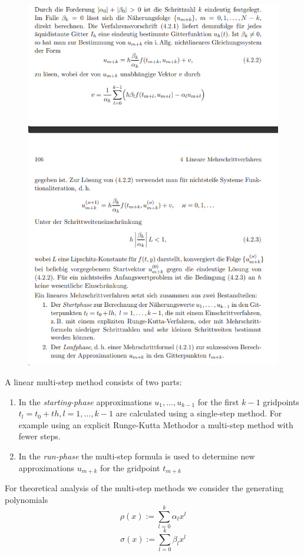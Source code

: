 	\begin{figure}[H]
		\centering
		\includegraphics[width=0.7\linewidth]{screenshot010}
		\caption{}
		\label{fig:screenshot010}
	\end{figure}
	
	A linear multi-step method consists of two parts:
	\begin{enumerate}
		\item In the \emph{starting-phase} approximations $u_1,...,u_{k-1}$ for the first $k-1$ gridpoints $t_l = t_0+th, l=1,...,k-1$ are calculated using a single-step method. For example using an explicit Runge-Kutta Methodor a multi-step method with fewer steps.
		
		\item  In the \emph{run-phase} the multi-step formula is used to determine new approximations $u_{m+k}$ for the gridpoint $t_{m+k}$
	\end{enumerate}
	
	For theoretical analysis of the multi-step methods we consider the generating polynomials
	\begin{equation}
		\rho(x) := \sum_{l=0}^{k} \alpha_l x^l
	\end{equation}
	\begin{equation}
		\sigma(x) := \sum_{l=0}^{k} \beta_l x^l
	\end{equation}
	
